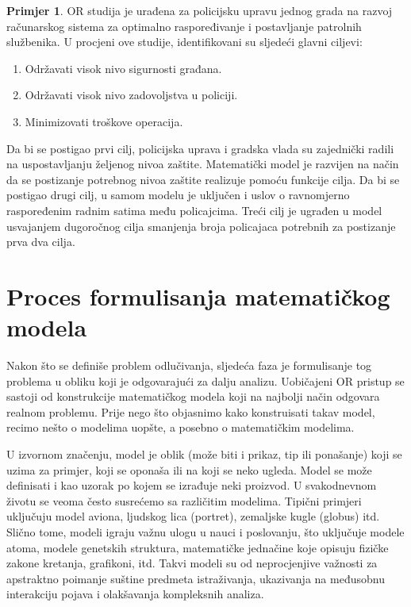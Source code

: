 \documentclass[a4paper, utf8, 11pt, colorlinks]{book}
\theoremstyle{definition}
\newtheorem{primjer}{Primjer}[chapter]
\begin{document}
\begin{primjer}
 OR studija je urađena za policijsku upravu jednog grada %
na razvoj računarskog sistema za optimalno raspoređivanje i postavljanje patrolnih službenika. U procjeni   ove studije, identifikovani su sljedeći glavni ciljevi:
\begin{enumerate}
    \item  Održavati visok nivo sigurnosti građana.
    \item  Održavati visok nivo zadovoljstva u policiji.
     \item Minimizovati troškove operacija.
\end{enumerate}
Da bi se postigao prvi cilj, policijska uprava i gradska vlada  su zajednički radili na uspostavljanju željenog nivoa zaštite.  Matematički model je razvijen na način da se postizanje potrebnog nivoa zaštite realizuje pomoću funkcije cilja.  Da bi se postigao drugi cilj, u samom modelu je uključen i uslov o ravnomjerno raspoređenim radnim satima među policajcima. Treći cilj je ugrađen u model usvajanjem dugoročnog cilja smanjenja broja policajaca potrebnih za postizanje prva dva cilja. 
\end{primjer}
\section{Proces formulisanja matematičkog modela}

Nakon što se definiše problem odlučivanja, sljedeća faza je formulisanje tog problema u obliku koji je odgovarajući za dalju analizu. Uobičajeni OR pristup se sastoji od konstrukcije matematičkog modela koji na najbolji način odgovara realnom problemu. Prije nego što objasnimo kako konstruisati takav model, recimo nešto o modelima uopšte, a posebno o matematičkim modelima.

 U izvornom značenju, 
model je oblik (može biti i prikaz, tip ili ponašanje) koji se uzima za primjer, koji se oponaša ili na koji se neko ugleda.  Model se može definisati i kao uzorak po kojem se izrađuje neki proizvod. U svakodnevnom životu se veoma često susrećemo sa različitim modelima.  Tipični primjeri uključuju model aviona, ljudskog lica (portret), zemaljske kugle (globus) itd. Slično tome, modeli igraju
važnu ulogu u nauci i poslovanju, što uključuje modele atoma, modele 
genetskih struktura, matematičke jednačine koje opisuju fizičke zakone kretanja, grafikoni, itd. Takvi modeli
su od neprocjenjive važnosti za apstraktno poimanje suštine predmeta istraživanja, ukazivanja na međusobnu interakciju pojava i olakšavanja kompleksnih analiza. 
\end{document}
